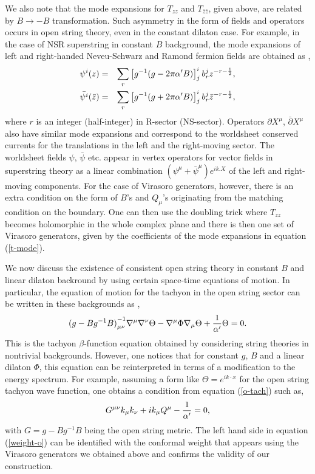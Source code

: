 \documentclass[a4paper,12pt]{article}
\begin{document}
We also note that the mode expansions for $T_{z z}$ and 
$T_{\bar{z} \bar{z}}$,
given above, are related by $B \rightarrow - B$
transformation. Such asymmetry in the form of fields and 
operators occurs in open string theory, even in the constant dilaton case. 
For example, in the case of NSR superstring in constant $B$ 
background, the mode expansions of left and right-handed 
Neveu-Schwarz and Ramond fermion fields are obtained as \cite{itoyama},
\begin{eqnarray}
\psi^i (z) & = & \sum_{r} \left [g^{-1} (g - 2\pi \alpha' B) \right ]^i_j
b_r^j z^{- r - {1\over 2}}, \nonumber \\
\bar{{\psi}^i}(\bar z) & = & \sum_{r} \left [g^{-1} 
(g+ 2\pi \alpha' B) \right ]^i_j b_r^j {\bar z}^{- r- {1\over 2}},   
\label{psi-psi}
\end{eqnarray}
where $r$ is an integer (half-integer) in R-sector 
(NS-sector). Operators 
$\partial X^{\mu}$, $\bar{\partial}X^{\mu}$ also have similar 
mode expansions\cite{itoyama} and correspond to 
the worldsheet conserved currents for the translations
in the left and the right-moving sector.
The worldsheet fields $\psi$, $\bar{\psi}$ etc. 
appear in  vertex operators for vector fields
in superstring theory \cite{itoyama} as a linear 
combination $(\psi^{\mu} + \bar{\psi}^{\mu}) e^{i k.X}$  
of the left and right-moving components.  
For the case of Virasoro generators, however, there is an extra 
condition on the form of $B$'s and $Q_{\mu}$'s originating from 
the matching condition on the boundary. 
One can then use the doubling
trick where $T_{zz}$ becomes holomorphic in the whole complex plane 
and there is then one set of Virasoro generators, given by the 
coefficients of the mode expansions in equation (\ref{t-mode}).

We now discuss the existence of consistent open string theory in  
constant $B$ and linear dilaton backround by using certain space-time 
equations of motion. In particular, the equation of motion for the 
tachyon in the open string sector can be written 
in these backgrounds as \cite{nappi,callan,friedan},
\begin{equation}
{(g - B g^{-1} B)}^{-1}_{\mu \nu} \nabla^{\mu}\nabla^{\nu}
\Theta - \nabla^{\mu}\Phi \nabla_{\mu} \Theta + 
{1\over \alpha'} \Theta = 0. 
\label{o-tach}
\end{equation}
This is the tachyon $\beta$-function equation obtained by 
considering string theories in nontrivial 
backgrounds\cite{callan,friedan}.
However, one notices that for constant $g$, $B$ and a linear dilaton
$\Phi$, this equation can be reinterpreted in terms of  a 
modification to the energy spectrum.
For example, assuming a form like $\Theta = e^{i k\cdot x}$ for the 
open string tachyon wave function,
one obtains a condition from equation (\ref{o-tach}) such as,
\begin{equation}
G^{\mu \nu} k_{\mu} k_{\nu} + i k_{\mu} Q^{\mu}
- {1\over \alpha'} =0, 
\label{weight-o}
\end{equation}
with $G = g - B g^{-1} B$ being the open  string metric. 
The left hand side in equation (\ref{weight-o})
can be identified with 
the conformal weight that appears using the Virasoro generators
we obtained above and confirms the validity of our construction. 
\end{document}
